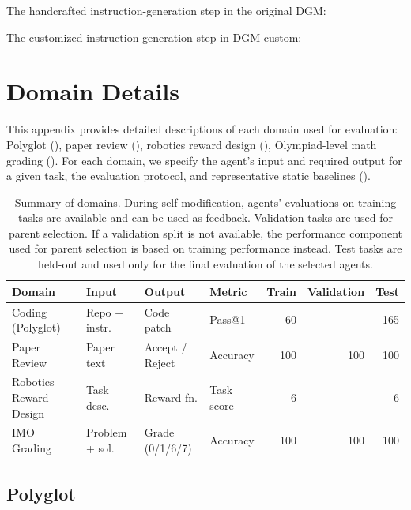 \documentclass{article}
\begin{document}
The handcrafted instruction-generation step in the original DGM:


The customized instruction-generation step in DGM-custom:


\section{Domain Details}
\label{app:domain-details}

This appendix provides detailed descriptions of each domain used for evaluation: Polyglot (), paper review (), robotics reward design (), Olympiad-level math grading (). For each domain, we specify the agent's input and required output for a given task, the evaluation protocol, and representative static baselines ().

\begin{table}[H]
\centering
\small
\setlength{\tabcolsep}{4pt}
\begin{tabular}{l l l l r r r}
\toprule
\textbf{Domain} & \textbf{Input} & \textbf{Output} & \textbf{Metric} & \textbf{Train} & \textbf{Validation} & \textbf{Test} \\
\midrule
Coding (Polyglot) & Repo + instr. & Code patch & Pass@1 & 60 & - & 165 \\
Paper Review & Paper text & Accept / Reject & Accuracy & 100 & 100 & 100 \\
Robotics Reward Design & Task desc. & Reward fn. & Task score & 6 & - & 6 \\
IMO Grading & Problem + sol. & Grade (0/1/6/7) & Accuracy & 100 & 100 & 100 \\
\bottomrule
\end{tabular}
\caption{Summary of domains. During self-modification, agents' evaluations on training tasks are available and can be used as feedback. Validation tasks are used for parent selection. If a validation split is not available, the performance component used for parent selection is based on training performance instead. Test tasks are held-out and used only for the final evaluation of the selected agents.}
\label{tab:domain-summary}
\end{table}

\subsection{Polyglot}
\label{app:domain-polyglot}
\end{document}
